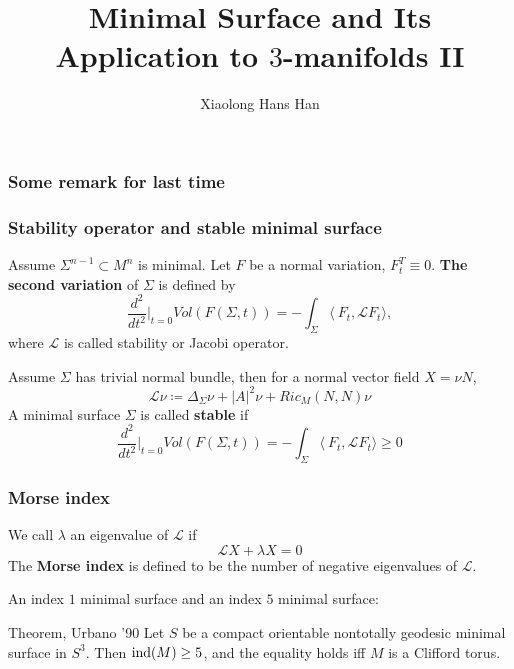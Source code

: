 \documentclass[t]{beamer}
\title[]{Minimal Surface and Its Application to $3$-manifolds II                                                                                                                                                                                                                                                                                                                                                                                                                                                                                                                                                                                                                                                                                                                                                                                                                                                                                                                                                                                                                                                                                                                                                                                                                                                                                                                                                                                                                                                                                                                                                                                                                                                                                                                                                                                                                                                                                                                                                                                                                                                                                                                                                                                                                                                                                                                                                                                                                                                                                                                                                                                                                                                                                                                                                                                                                                  }
\author{Xiaolong Hans Han}
\institute[UIUC]
{
Toronto Geometric Analysis Seminar}
\date
\newcommand{\ds}{\displaystyle}
\newcommand{\tn}{\textnormal}
\newcommand{\LL}{\mathcal{L}}
\begin{document}
\begin{frame}
\titlepage 
\end{frame}

\begin{frame}
	\frametitle{Some remark for last time}
\end{frame}

\begin{frame}[t]
	\frametitle{Stability operator and stable minimal surface}
	Assume $\Sigma^{n-1}\subset M^n$ is minimal. Let $F$ be a normal variation, $F^T_t \equiv 0$. \textbf{The second variation} of $\Sigma$ is defined by
	\begin{equation}
		\ds \frac{d^2}{dt^2}\bigg|_{t=0} Vol(F(\Sigma, t)) =-\int_{\Sigma}\langle\ F_t, \LL F_t \rangle,
	\end{equation}
where $\LL$ is called stability or Jacobi operator. \par
\vspace{0.1in}
Assume $\Sigma$ has trivial normal bundle, then for a normal vector field $X= \nu N$, 
\begin{equation}
\LL \nu \coloneqq \Delta_{\Sigma} \nu +|A|^2 \nu +Ric_M(N,N) \nu
\end{equation}
\vspace{0.1in}
A minimal surface $\Sigma$ is called \textbf{stable} if
\begin{equation}
	\ds \frac{d^2}{dt^2}\bigg|_{t=0} Vol(F(\Sigma, t)) =-\int_{\Sigma}\langle\ F_t, \LL F_t \rangle \geq 0
\end{equation}
\end{frame}

\begin{frame}
		\frametitle{Morse index}
	We call $\lambda$ an eigenvalue of $\LL$ if 
	\begin{equation}
		\LL X +\lambda X=0
	\end{equation}
	The \textbf{Morse index} is defined to be the number of negative eigenvalues of $\LL$. \par 
	\vspace{0.1in}
	An index $1$ minimal surface and an index $5$ minimal surface:
	\vspace{1in}
	\begin{block}{Theorem, Urbano '90}
	Let $S$ be a compact orientable nontotally geodesic minimal surface in $S^3$. Then $\tn{ind}(M) \geq 5$, and the equality holds iff $M$ is a Clifford torus. 
	\end{block}
\end{frame}
\end{document}
